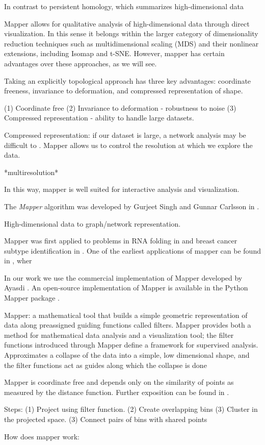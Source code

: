 In contrast to persistent homology, which summarizes high-dimensional data 

Mapper allows for qualitative analysis of high-dimensional data through direct visualization.
In this sense it belongs within the larger category of dimensionality reduction techniques such as multidimensional scaling (MDS) and their nonlinear extensions, including Isomap and t-SNE.
However, mapper has certain advantages over these approaches, as we will see.

Taking an explicitly topological approach has three key advantages: coordinate freeness, invariance to deformation, and compressed representation of shape.

(1) Coordinate free
(2) Invariance to deformation - robustness to noise
(3) Compressed representation - ability to handle large datasets.

Compressed representation: if our dataset is large, a network analysis may be difficult to .
Mapper allows us to control the resolution at which we explore the data.

*multiresolution*


In this way, mapper is well suited for interactive analysis and visualization.

The \emph{Mapper} algorithm was developed by Gurjeet Singh and Gunnar Carlsson in \cite{Singh:2007ve}.

High-dimensional data to graph/network representation.


Mapper was first applied to problems in RNA folding in \cite{Bowman:2008esa} and breast cancer subtype identification in \cite{Nicolau:2011}.
One of the earliest applications of mapper can be found in \cite{Nicolau:2011}, wher


In our work we use the commercial implementation of Mapper developed by Ayasdi \cite{AyasdiIris:2015}.
An open-source implementation of Mapper is available in the Python Mapper package \cite{Mullner:2013}.


Mapper: a mathematical tool that builds a simple geometric representation of data along preassigned guiding functions called filters. Mapper provides both a method for mathematical data analysis and a visualization tool; the filter functions introduced through Mapper define a framework for supervised analysis. Approximates a collapse of the data into a simple, low dimensional shape, and the filter functions act as guides along which the collapse is done


Mapper is coordinate free and depends only on the similarity of points as measured by the distance function.
Further exposition can be found in \cite{Lum:2013cz}.



Steps:
(1) Project using filter function.
(2) Create overlapping bins
(3) Cluster in the projected space.
(3) Connect pairs of bins with shared points



How does mapper work:

